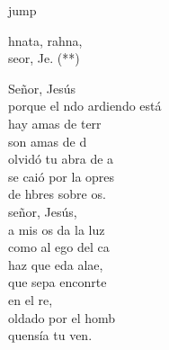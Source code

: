 \begin{cancion}[Marahnata][Nico]jump\\
	\begin{chorus}%
		hnata, rahna,\\
		 seor, Je. (**)\jump\\
	\end{chorus}%
	\jump
	 Señor, Jesús\\
	porque el ndo ardiendo está\\
	hay amas de terr\\
	son amas de d\\
	 olvidó tu abra de a\\
	se caió por la opres\\
	de hbres sobre os.\\
	\jump
	 señor, Jesús,\\
	a mis os da la luz\\
	como al ego del ca\\
	haz que eda alae,\\
	que sepa enconrte\\
	en el re,\\
	oldado por el homb\\
	quensía tu ven.\\
\end{cancion}%
